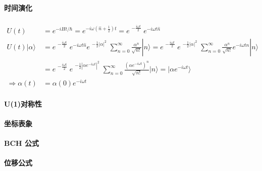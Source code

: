 \documentclass[../../main.tex]{subfiles}
\begin{document}
\paragraph{时间演化}
\begin{align*}
        U(t) &= e^{-iHt/\hbar} = e^{-i\omega\left(\hat{n} + \frac{1}{2}\right)t} = e^{\begin{aligned}
            -\frac{i\omega t}{2}
        \end{aligned}}e^{-i\omega t\hat{n}}\\
        U(t)|\alpha\rangle &= e^{\begin{aligned}
            -\frac{i\omega t}{2}
        \end{aligned}}e^{-i\omega t\hat{n}}e^{\begin{aligned}
            -\frac{1}{2}|\alpha|^{2}
        \end{aligned}}\sum_{n=0}^{\infty}\frac{\alpha^{n}}{\sqrt{n!}}|n\rangle 
        = e^{\begin{aligned}-\frac{i\omega t}{2}\end{aligned}}
          e^{\begin{aligned}-\frac{1}{2}|\alpha|^{2}
        \end{aligned}}
          \sum_{n=0}^{\infty}\frac{\alpha^{n}}{\sqrt{n!}}e^{-i\omega t n}|n\rangle\\
          &= e^{\begin{aligned}-\frac{i\omega t}{2}\end{aligned}}
          e^{\begin{aligned}-\frac{1}{2}|\alpha e^{-i\omega t}|^{2}
        \end{aligned}}
          \sum_{n=0}^{\infty}\frac{(\alpha e^{-i\omega t})^{n}}{\sqrt{n!}}|n\rangle
          = |\alpha e^{-i\omega t}\rangle\\
          \Rightarrow \alpha(t) &= \alpha(0)e^{-i\omega t}
\end{align*}
\paragraph{U(1)对称性}
\paragraph{坐标表象}
\paragraph{BCH 公式}
\paragraph{位移公式}
\end{document}
